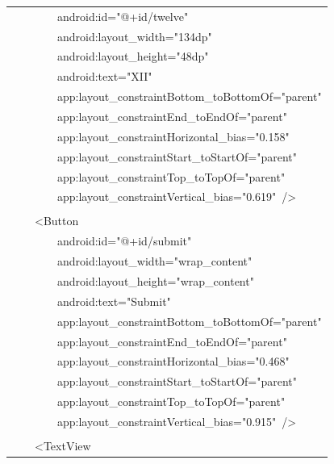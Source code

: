 \documentclass[a4paper,12pt]{article}
\begin{document}
\begin{longtable}{|p{}|}
{\ttfamily\small \ \ \ \ \ \ \ \ android:id="@+id/twelve"} \\
{\ttfamily\small \ \ \ \ \ \ \ \ android:layout\_width="134dp"} \\
{\ttfamily\small \ \ \ \ \ \ \ \ android:layout\_height="48dp"} \\
{\ttfamily\small \ \ \ \ \ \ \ \ android:text="XII"} \\
{\ttfamily\small \ \ \ \ \ \ \ \ app:layout\_constraintBottom\_toBottomOf="parent"} \\
{\ttfamily\small \ \ \ \ \ \ \ \ app:layout\_constraintEnd\_toEndOf="parent"} \\
{\ttfamily\small \ \ \ \ \ \ \ \ app:layout\_constraintHorizontal\_bias="0.158"} \\
{\ttfamily\small \ \ \ \ \ \ \ \ app:layout\_constraintStart\_toStartOf="parent"} \\
{\ttfamily\small \ \ \ \ \ \ \ \ app:layout\_constraintTop\_toTopOf="parent"} \\
{\ttfamily\small \ \ \ \ \ \ \ \ app:layout\_constraintVertical\_bias="0.619"\ /\textgreater{}} \\
\strut \\
{\ttfamily\small \ \ \ \ \textless{}Button} \\
{\ttfamily\small \ \ \ \ \ \ \ \ android:id="@+id/submit"} \\
{\ttfamily\small \ \ \ \ \ \ \ \ android:layout\_width="wrap\_content"} \\
{\ttfamily\small \ \ \ \ \ \ \ \ android:layout\_height="wrap\_content"} \\
{\ttfamily\small \ \ \ \ \ \ \ \ android:text="Submit"} \\
{\ttfamily\small \ \ \ \ \ \ \ \ app:layout\_constraintBottom\_toBottomOf="parent"} \\
{\ttfamily\small \ \ \ \ \ \ \ \ app:layout\_constraintEnd\_toEndOf="parent"} \\
{\ttfamily\small \ \ \ \ \ \ \ \ app:layout\_constraintHorizontal\_bias="0.468"} \\
{\ttfamily\small \ \ \ \ \ \ \ \ app:layout\_constraintStart\_toStartOf="parent"} \\
{\ttfamily\small \ \ \ \ \ \ \ \ app:layout\_constraintTop\_toTopOf="parent"} \\
{\ttfamily\small \ \ \ \ \ \ \ \ app:layout\_constraintVertical\_bias="0.915"\ /\textgreater{}} \\
\strut \\
{\ttfamily\small \ \ \ \ \textless{}TextView} \\

\end{longtable}
\end{document}
